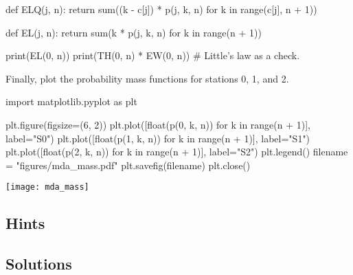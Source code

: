 \begin{exercise}
\begin{solution}
\begin{pyconsole}
def ELQ(j, n):
    return sum((k - c[j]) * p(j, k, n) for k in range(c[j], n + 1))


def EL(j, n):
    return sum(k * p(j, k, n) for k in range(n + 1))

print(EL(0, n))
print(TH(0, n) * EW(0, n)) # Little's law as a check.
  
\end{pyconsole}

Finally, plot the probability mass functions for stations 0, 1, and 2.

  
\begin{pyconsole}
import matplotlib.pyplot as plt

plt.figure(figsize=(6, 2))
plt.plot([float(p(0, k, n)) for k in range(n + 1)], label="S0")
plt.plot([float(p(1, k, n)) for k in range(n + 1)], label="S1")
plt.plot([float(p(2, k, n)) for k in range(n + 1)], label="S2")
plt.legend()
filename = "figures/mda_mass.pdf"
plt.savefig(filename)
plt.close()
  
\end{pyconsole}

\texttt{[image: mda\_mass]}

  \end{solution}
\end{exercise}





\subsection*{Hints}

\subsection*{Solutions}

\clearpage

